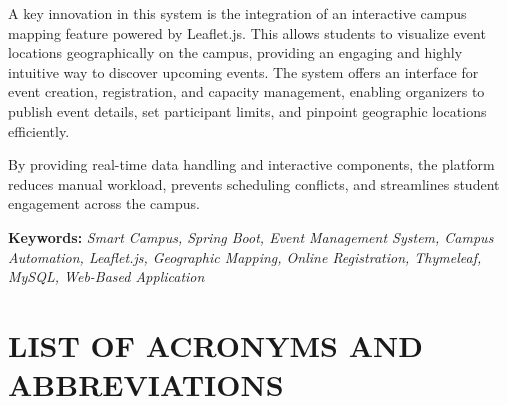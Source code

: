 \documentclass[10pt]{report}
\begin{document}
A key innovation in this system is the integration of an interactive campus mapping feature powered by Leaflet.js. This allows students to visualize event locations geographically on the campus, providing an engaging and highly intuitive way to discover upcoming events. The system offers an interface for event creation, registration, and capacity management, enabling organizers to publish event details, set participant limits, and pinpoint geographic locations efficiently.

By providing real-time data handling and interactive components, the platform reduces manual workload, prevents scheduling conflicts, and streamlines student engagement across the campus.

\noindent \textbf{Keywords:} \textit{Smart Campus, Spring Boot, Event Management System, Campus Automation, Leaflet.js, Geographic Mapping, Online Registration, Thymeleaf, MySQL, Web-Based Application}
  
\textbf{} 
\renewcommand*\listfigurename{LIST OF FIGURES} 

\listoffigures 
\renewcommand{\listtablename}{LIST OF TABLES}

\listoftables
 
\clearpage   %

\chapter*{\centering LIST OF ACRONYMS AND ABBREVIATIONS}

\vspace{-1cm}   %
\end{document}

